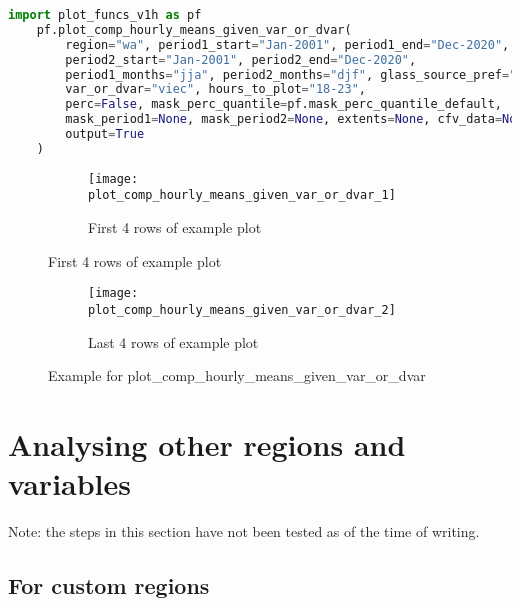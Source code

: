 \begin{lstlisting}[language=Python,caption={Example for plot\_comp\_hourly\_means\_given\_var\_or\_dvar},captionpos=b]
	import plot_funcs_v1h as pf
	pf.plot_comp_hourly_means_given_var_or_dvar(
		region="wa", period1_start="Jan-2001", period1_end="Dec-2020", 
		period2_start="Jan-2001", period2_end="Dec-2020", 
		period1_months="jja", period2_months="djf", glass_source_pref="modis", 
		var_or_dvar="viec", hours_to_plot="18-23", 
		perc=False, mask_perc_quantile=pf.mask_perc_quantile_default, 
		mask_period1=None, mask_period2=None, extents=None, cfv_data=None, 
		output=True
	)
\end{lstlisting}

\begin{figure}[!htp]
	\centering
	\begin{subfigure}[!htp]{0.9\textwidth}
		\centering
		\texttt{[image: plot\_comp\_hourly\_means\_given\_var\_or\_dvar\_1]}
		\caption[]{First 4 rows of example plot}
	\end{subfigure}
\end{figure}

\begin{figure}[!htp]\ContinuedFloat
	\begin{subfigure}[!htp]{0.9\textwidth}
		\centering
		\texttt{[image: plot\_comp\_hourly\_means\_given\_var\_or\_dvar\_2]}
		\caption[]{Last 4 rows of example plot}
	\end{subfigure}
	\caption{Example for plot\_comp\_hourly\_means\_given\_var\_or\_dvar}
	\label{fig:plot_comp_hourly_means_given_var_or_dvar}
\end{figure}

\section{Analysing other regions and variables}

Note: the steps in this section have not been tested as of the time of writing.

\subsection{For custom regions}

